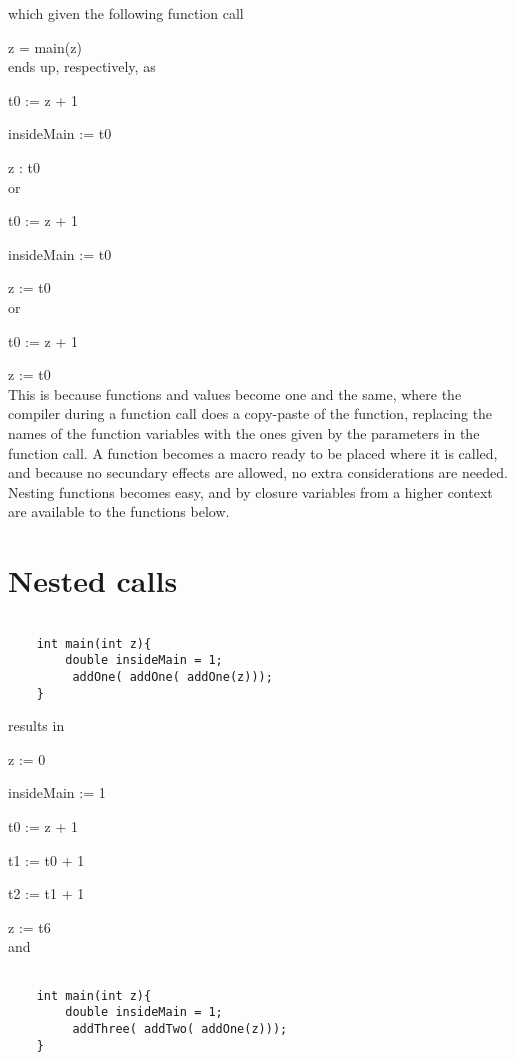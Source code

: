 \documentclass[twocolumn,10ptr]{article}
\begin{document}
	which given the following function call
	
	z = main(z)\\
	
	ends up, respectively, as 
	
	t0 := z + 1
	
	insideMain := t0
	
	z : t0\\
	
	or 
	
	t0 := z + 1
	
	insideMain := t0
	
	z := t0\\
	
	or 
	
	t0 := z + 1 
	
	z := t0 \\ 
	
	This is because functions and values become one and the same, where the compiler during a function call does 
	a copy-paste of the function, replacing the names of the function variables with the ones given by the parameters
	in the function call. A function becomes a macro ready to be placed where it is called, and because no secundary effects
	are allowed, no extra considerations are needed.
	Nesting functions becomes easy, and by closure variables from a higher context are available to the functions below.
	
	
	\section{Nested calls}
	
	\begin{lstlisting}

	int main(int z){
		double insideMain = 1;
		 addOne( addOne( addOne(z)));
	}
	\end{lstlisting}
	
	results in	
	
	z := 0
	
	insideMain := 1
	
	t0 := z + 1
	
	t1 := t0 + 1
	
	t2 := t1 + 1
	
	z := t6 \\
	
	and
	
	\begin{lstlisting}

	int main(int z){
		double insideMain = 1;
		 addThree( addTwo( addOne(z)));
	}
	\end{lstlisting}
	
\end{document}
